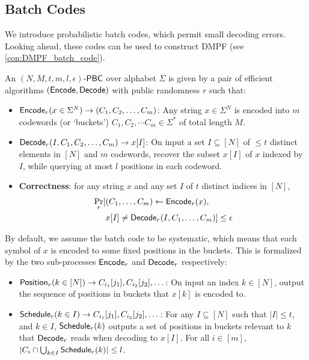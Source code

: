  

\subsection{Batch Codes}
We introduce probabilistic batch codes, which permit small decoding errors. Looking ahead, these codes can be used to construct DMPF (see \cref{con:DMPF_batch_code}). 
\begin{definition}\label{def:PBC}
  An $(N,M,t,m,l,\epsilon)$-${\sf PBC}$ over alphabet $\Sigma$ is given by a pair of efficient algorithms $({\sf Encode},{\sf Decode})$ with public randomness $r$ such that:
  \begin{itemize}
    \item ${\sf Encode}_r(x\in\Sigma^N)\rightarrow (C_1,C_2,\dots,C_m)$: Any string $x\in\Sigma^N$ is encoded into $m$ codewords (or `buckets') $C_1,C_2,\cdots C_m\in\Sigma^*$ of total length $M$.
    \item ${\sf Decode}_r(I,C_1,C_2,\dots,C_m)\rightarrow x[I]$: On input a set $I\subseteq[N]$ of $\le t$ distinct elements in $[N]$ and $m$ codewords, recover the subset $x[I]$ of $x$ indexed by $I$, while querying at most $l$ positions in each codeword. 
    \item \textbf{Correctness}: for any string $x$ and any set $I$ of $t$ distinct indices in $[N]$, 
    \[
    \begin{split}
      \Pr_r[&(C_1,\dots, C_m)\gets {\sf Encode}_r(x), \\
      &x[I]\not= {\sf Decode}_r(I,C_1,\dots,C_m)] \le \epsilon
    \end{split}
    \]
  \end{itemize}
  By default, we assume the batch code to be systematic, which means that each symbol of $x$ is encoded to some fixed positions in the buckets. This is formalized by the two sub-processes ${\sf Encode}_r$ and ${\sf Decode}_r$ respectively: 
  \begin{itemize}
    \item ${\sf Position}_r(k\in[N])\rightarrow C_{i_1}[j_1],C_{i_2}[j_2],\dots$: On input an index $k\in[N]$, output the sequence of positions in buckets that $x[k]$ is encoded to. 
    \item ${\sf Schedule}_r(k\in I)\rightarrow C_{i_1}[j_1],C_{i_2}[j_2],\dots$: For any $I\subseteq [N]$ such that $|I|\le t$, and $k\in I$, ${\sf Schedule}_r(k)$ outputs a set of positions in buckets relevant to $k$ that ${\sf Decode}_r$ reads when decoding to $x[I]$. For all $i\in [m]$, $|C_i\cap \bigcup_{k\in I}{\sf Schedule}_r(k)|\le l$. 
  \end{itemize}
\end{definition}

